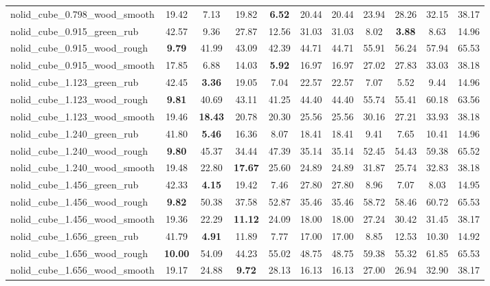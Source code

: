\begin{table}[H]
{\begin{tabular}{l cccccccccc}
        nolid\_cube\_0.798\_wood\_smooth & 19.42 & 7.13 & 19.82 & \textbf{6.52} & 20.44 & 20.44 & 23.94 & 28.26 & 32.15 & 38.17 \\
        nolid\_cube\_0.915\_green\_rub & 42.57 & 9.36 & 27.87 & 12.56 & 31.03 & 31.03 & 8.02 & \textbf{3.88} & 8.63 & 14.96 \\
        nolid\_cube\_0.915\_wood\_rough & \textbf{9.79} & 41.99 & 43.09 & 42.39 & 44.71 & 44.71 & 55.91 & 56.24 & 57.94 & 65.53 \\
        nolid\_cube\_0.915\_wood\_smooth & 17.85 & 6.88 & 14.03 & \textbf{5.92} & 16.97 & 16.97 & 27.02 & 27.83 & 33.03 & 38.18 \\
        nolid\_cube\_1.123\_green\_rub & 42.45 & \textbf{3.36} & 19.05 & 7.04 & 22.57 & 22.57 & 7.07 & 5.52 & 9.44 & 14.96 \\
        nolid\_cube\_1.123\_wood\_rough & \textbf{9.81} & 40.69 & 43.11 & 41.25 & 44.40 & 44.40 & 55.74 & 55.41 & 60.18 & 63.56 \\
        nolid\_cube\_1.123\_wood\_smooth & 19.46 & \textbf{18.43} & 20.78 & 20.30 & 25.56 & 25.56 & 30.16 & 27.21 & 33.93 & 38.18 \\
        nolid\_cube\_1.240\_green\_rub & 41.80 & \textbf{5.46} & 16.36 & 8.07 & 18.41 & 18.41 & 9.41 & 7.65 & 10.41 & 14.96 \\
        nolid\_cube\_1.240\_wood\_rough & \textbf{9.80} & 45.37 & 34.44 & 47.39 & 35.14 & 35.14 & 52.45 & 54.43 & 59.38 & 65.52 \\
        nolid\_cube\_1.240\_wood\_smooth & 19.48 & 22.80 & \textbf{17.67} & 25.60 & 24.89 & 24.89 & 31.87 & 25.74 & 32.83 & 38.18 \\
        nolid\_cube\_1.456\_green\_rub & 42.33 & \textbf{4.15} & 19.42 & 7.46 & 27.80 & 27.80 & 8.96 & 7.07 & 8.03 & 14.95 \\
        nolid\_cube\_1.456\_wood\_rough & \textbf{9.82} & 50.38 & 37.58 & 52.87 & 35.46 & 35.46 & 58.72 & 58.46 & 60.72 & 65.53 \\
        nolid\_cube\_1.456\_wood\_smooth & 19.36 & 22.29 & \textbf{11.12} & 24.09 & 18.00 & 18.00 & 27.24 & 30.42 & 31.45 & 38.17 \\
        nolid\_cube\_1.656\_green\_rub & 41.79 & \textbf{4.91} & 11.89 & 7.77 & 17.00 & 17.00 & 8.85 & 12.53 & 10.30 & 14.92 \\
        nolid\_cube\_1.656\_wood\_rough & \textbf{10.00} & 54.09 & 44.23 & 55.02 & 48.75 & 48.75 & 59.38 & 55.32 & 61.85 & 65.53 \\
        nolid\_cube\_1.656\_wood\_smooth & 19.17 & 24.88 & \textbf{9.72} & 28.13 & 16.13 & 16.13 & 27.00 & 26.94 & 32.90 & 38.17 \\

\end{tabular}}
\end{table}

